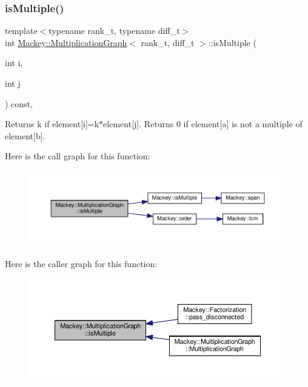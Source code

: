 \subsubsection{\texorpdfstring{is\+Multiple()}{isMultiple()}}
{\footnotesize\ttfamily template$<$typename rank\+\_\+t, typename diff\+\_\+t$>$ \\
int \hyperlink{classMackey_1_1MultiplicationGraph}{Mackey\+::\+Multiplication\+Graph}$<$ rank\+\_\+t, diff\+\_\+t $>$\+::is\+Multiple (\begin{DoxyParamCaption}\item[{int}]{i,  }\item[{int}]{j }\end{DoxyParamCaption}) const\hspace{0.3cm}{\ttfamily [inline]}, {\ttfamily [protected]}}



Returns k if element\mbox{[}i\mbox{]}=k$\ast$element\mbox{[}j\mbox{]}. Returns 0 if element\mbox{[}a\mbox{]} is not a multiple of element\mbox{[}b\mbox{]}. 

Here is the call graph for this function\+:\nopagebreak
\begin{figure}[H]
\begin{center}
\leavevmode
\includegraphics[width=350pt]{classMackey_1_1MultiplicationGraph_a6ac7e92d6ceb6bc146f855898916449f_cgraph}
\end{center}
\end{figure}
Here is the caller graph for this function\+:\nopagebreak
\begin{figure}[H]
\begin{center}
\leavevmode
\includegraphics[width=350pt]{classMackey_1_1MultiplicationGraph_a6ac7e92d6ceb6bc146f855898916449f_icgraph}
\end{center}
\end{figure}


